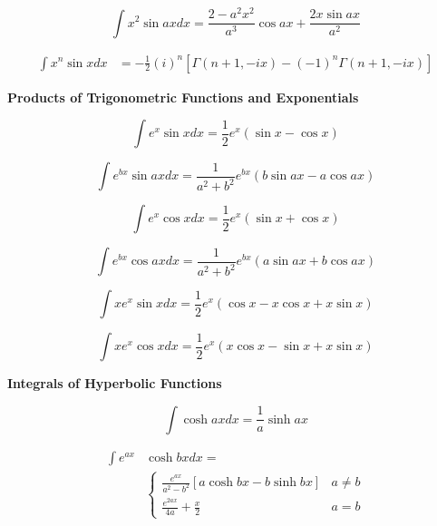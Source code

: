 \documentclass[11pt,twoside]{article}
\begin{document}
\begin{multicols}{3}
\begin{footnotesize}
\begin{equation}
\int x^2 \sin ax dx =\frac{2-a^2x^2}{a^3}\cos ax +\frac{ 2 x \sin ax}{a^2}
\end{equation}

\begin{align}
\int x^n \sin x dx &= -\frac{1}{2}(i)^n\left[ \Gamma(n+1, -ix)
 - (-1)^n\Gamma(n+1, -ix)\right]
\end{align}


\begin{center} \textbf{Products of Trigonometric Functions and Exponentials} \end{center}

\begin{equation}
\int e^x \sin x dx = \frac{1}{2}e^x (\sin x - \cos x)
\end{equation}

\begin{equation}
\int e^{bx} \sin ax dx = \frac{1}{a^2+b^2}e^{bx} (b\sin ax - a\cos ax)
\end{equation}

\begin{equation}
\int e^x \cos x dx = \frac{1}{2}e^x (\sin x + \cos x)
\end{equation}

\begin{equation}
\int e^{bx} \cos ax dx = \frac{1}{a^2 + b^2} e^{bx} ( a \sin ax + b \cos ax )
\end{equation}

\begin{equation}
\int x e^x \sin x dx = \frac{1}{2}e^x (\cos x - x \cos x + x \sin x)
\end{equation}

\begin{equation}
\int x e^x \cos x dx = \frac{1}{2}e^x (x \cos x
- \sin x + x \sin x)
\end{equation}

\begin{center} \textbf{Integrals of Hyperbolic Functions} \end{center}

\begin{equation}
\int \cosh ax dx =\frac{1}{a} \sinh ax
\end{equation}

\begin{align}
\int e^{ax} & \cosh bx dx = \nonumber \\ &
\begin{cases}
\displaystyle{\frac{e^{ax}}{a^2-b^2} }[ a \cosh bx - b \sinh bx ]  & a\ne b \\
\displaystyle{\frac{e^{2ax}}{4a} + \frac{x}{2}}  & a = b
\end{cases}
\end{align}


\end{footnotesize}
\end{multicols}
\end{document}
